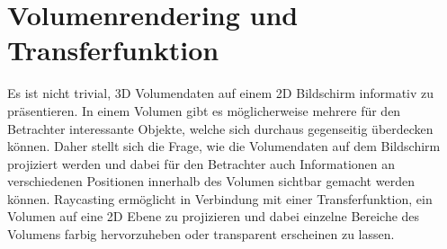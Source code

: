 \section{Volumenrendering und Transferfunktion}\label{sec::voltff}
Es ist nicht trivial, 3D Volumendaten auf einem 2D Bildschirm informativ zu präsentieren.
In einem Volumen gibt es möglicherweise mehrere für den Betrachter interessante Objekte, welche sich durchaus gegenseitig überdecken können.
Daher stellt sich die Frage, wie die Volumendaten auf dem Bildschirm projiziert werden und dabei für den Betrachter auch Informationen an verschiedenen Positionen innerhalb des Volumen sichtbar gemacht werden können.
Raycasting ermöglicht in Verbindung mit einer Transferfunktion, ein Volumen auf eine 2D Ebene zu projizieren und dabei einzelne Bereiche des Volumens farbig hervorzuheben oder transparent erscheinen zu lassen.

